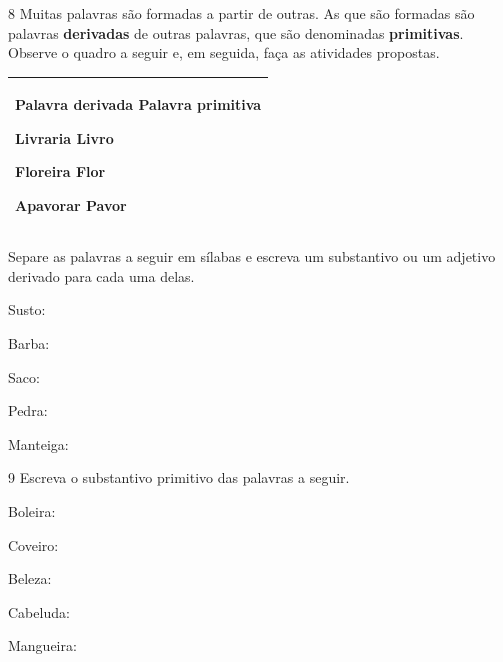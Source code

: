 \num{8} Muitas palavras são formadas a partir de outras. As que são formadas são
palavras \textbf{derivadas} de outras palavras, que são denominadas
\textbf{primitivas}. Observe o quadro a seguir e, em seguida, faça as
atividades propostas.

\begin{longtable}[]{@{}l@{}}
\toprule
\begin{minipage}[t]{0.97\columnwidth}\raggedright\strut
\textbf{Palavra derivada Palavra primitiva}

Livraria Livro

Floreira Flor

Apavorar Pavor\strut
\end{minipage}\tabularnewline
\bottomrule
\end{longtable}

Separe as palavras a seguir em sílabas e escreva um substantivo ou um
adjetivo derivado para cada uma delas.

\begin{escolha}
\item Susto: 

\item
  Barba: 

\item
  Saco: 

\item
  Pedra: 

\item
  Manteiga: 
\end{escolha}

\num{9} Escreva o substantivo primitivo das palavras a seguir.

\begin{escolha}
\item Boleira: 

\item Coveiro: 

\item Beleza: 

\item Cabeluda: 

\item Mangueira: 
\end{escolha}

